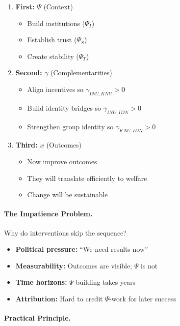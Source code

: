 \begin{enumerate}
\item \textbf{First: $\Psi$} (Context)
\begin{itemize}
\item Build institutions ($\Psi_I$)
\item Establish trust ($\Psi_S$)
\item Create stability ($\Psi_T$)
\end{itemize}

\item \textbf{Second: $\gamma$} (Complementarities)
\begin{itemize}
\item Align incentives so $\gamma_{INU,KNU} > 0$
\item Build identity bridges so $\gamma_{INU,IDN} > 0$
\item Strengthen group identity so $\gamma_{KNU,IDN} > 0$
\end{itemize}

\item \textbf{Third: $x$} (Outcomes)
\begin{itemize}
\item Now improve outcomes
\item They will translate efficiently to welfare
\item Change will be sustainable
\end{itemize}
\end{enumerate}

\paragraph{The Impatience Problem.}
Why do interventions skip the sequence?

\begin{itemize}
\item \textbf{Political pressure:} ``We need results now''
\item \textbf{Measurability:} Outcomes are visible; $\Psi$ is not
\item \textbf{Time horizons:} $\Psi$-building takes years
\item \textbf{Attribution:} Hard to credit $\Psi$-work for later success
\end{itemize}

\paragraph{Practical Principle.}

